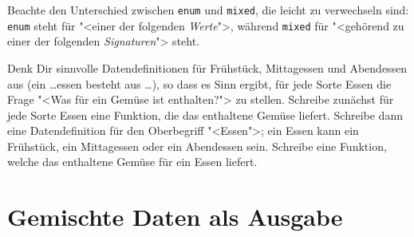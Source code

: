 Beachte den Unterschied zwischen \lstinline{enum} und
\lstinline{mixed}, die leicht zu verwechseln sind: \lstinline{enum} steht
für "<einer der folgenden \emph{Werte}">, während \lstinline{mixed} für
"<gehörend zu einer der folgenden \emph{Signaturen}"> steht.

\begin{aufgabeinline}
  Denk Dir sinnvolle Datendefinitionen für Frühstück, Mittagessen und
  Abendessen aus (ein \ldots{}essen besteht aus \ldots), so dass es
  Sinn ergibt, für jede Sorte Essen die Frage "<Was für ein Gemüse ist
  enthalten?"> zu stellen.  Schreibe zunächst für jede Sorte Essen
  eine Funktion, die das enthaltene Gemüse liefert.  Schreibe dann
  eine Datendefinition für den Oberbegriff "<Essen">; ein Essen kann
  ein Frühstück, ein Mittagessen oder ein Abendessen sein.  Schreibe
  eine Funktion, welche das enthaltene Gemüse für ein Essen liefert.
\end{aufgabeinline}

\section{Gemischte Daten als Ausgabe}
\label{sec:feed-animal}

